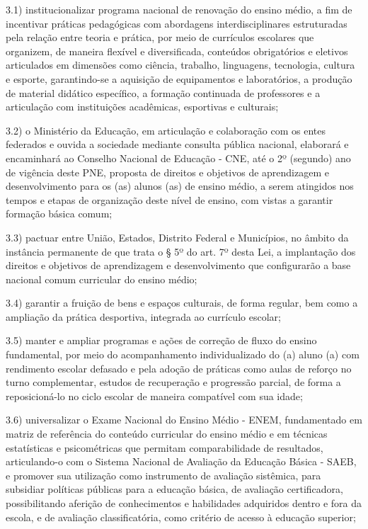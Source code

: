 \documentclass[
]{book}
\begin{document}
3.1) institucionalizar programa nacional de renovação do ensino médio, a fim de incentivar práticas pedagógicas com abordagens interdisciplinares estruturadas pela relação entre teoria e prática, por meio de currículos escolares que organizem, de maneira flexível e diversificada, conteúdos obrigatórios e eletivos articulados em dimensões como ciência, trabalho, linguagens, tecnologia, cultura e esporte, garantindo-se a aquisição de equipamentos e laboratórios, a produção de material didático específico, a formação continuada de professores e a articulação com instituições acadêmicas, esportivas e culturais;

3.2) o Ministério da Educação, em articulação e colaboração com os entes federados e ouvida a sociedade mediante consulta pública nacional, elaborará e encaminhará ao Conselho Nacional de Educação - CNE, até o 2º (segundo) ano de vigência deste PNE, proposta de direitos e objetivos de aprendizagem e desenvolvimento para os (as) alunos (as) de ensino médio, a serem atingidos nos tempos e etapas de organização deste nível de ensino, com vistas a garantir formação básica comum;

3.3) pactuar entre União, Estados, Distrito Federal e Municípios, no âmbito da instância permanente de que trata o § 5º do art. 7º desta Lei, a implantação dos direitos e objetivos de aprendizagem e desenvolvimento que configurarão a base nacional comum curricular do ensino médio;

3.4) garantir a fruição de bens e espaços culturais, de forma regular, bem como a ampliação da prática desportiva, integrada ao currículo escolar;

3.5) manter e ampliar programas e ações de correção de fluxo do ensino fundamental, por meio do acompanhamento individualizado do (a) aluno (a) com rendimento escolar defasado e pela adoção de práticas como aulas de reforço no turno complementar, estudos de recuperação e progressão parcial, de forma a reposicioná-lo no ciclo escolar de maneira compatível com sua idade;

3.6) universalizar o Exame Nacional do Ensino Médio - ENEM, fundamentado em matriz de referência do conteúdo curricular do ensino médio e em técnicas estatísticas e psicométricas que permitam comparabilidade de resultados, articulando-o com o Sistema Nacional de Avaliação da Educação Básica - SAEB, e promover sua utilização como instrumento de avaliação sistêmica, para subsidiar políticas públicas para a educação básica, de avaliação certificadora, possibilitando aferição de conhecimentos e habilidades adquiridos dentro e fora da escola, e de avaliação classificatória, como critério de acesso à educação superior;
\end{document}
